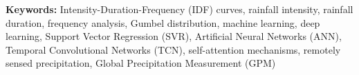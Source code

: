 \noindent\textbf{Keywords:} Intensity-Duration-Frequency (IDF) curves, rainfall intensity, rainfall duration, frequency analysis, Gumbel distribution, machine learning, deep learning, Support Vector Regression (SVR), Artificial Neural Networks (ANN), Temporal Convolutional Networks (TCN), self-attention mechanisms, remotely sensed precipitation, Global Precipitation Measurement (GPM)